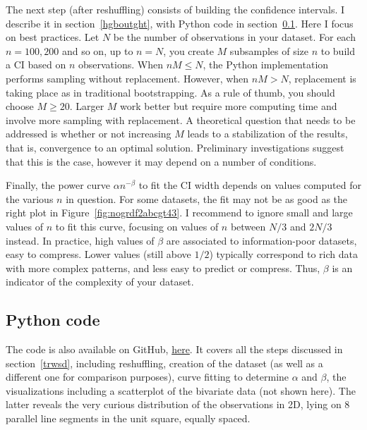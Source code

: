 \documentclass[oneside,10pt]{book}
\begin{document}
The next step (after reshuffling) consists of building the confidence intervals. I describe it in section~\ref{hgboutght}, 
 with Python code in section~\ref{joyofpython}. Here I focus on best practices. Let $N$ be the number of observations in your dataset.
 For each $n=100, 200$ and so on, up to $n = N$, you create $M$ subsamples of size $n$ to build a CI based on $n$ observations. 
When $nM \leq N$, the Python implementation performs sampling without replacement. However, when $nM > N$, replacement is taking place as in traditional \textcolor{index}{bootstrapping}. As a rule of thumb, you should choose $M\geq 20$.
 Larger $M$ work better but require more computing time and involve more sampling with replacement. A theoretical question that needs to be addressed is whether or not increasing $M$ leads to a stabilization of the results, that is, convergence to an optimal solution. 
 Preliminary investigations suggest that this is the case, however it may depend on a number of conditions.

Finally, the power curve $\alpha n^{-\beta}$ to fit the CI width depends on values computed for the various $n$ in question. For some datasets, the fit may not be as good as the right plot in Figure~\ref{fig:nogrdf2abcgt43}. I recommend to ignore small and large values of $n$ to fit this curve, focusing on values of $n$ between $N/3$ and $2N/3$ instead. In practice, high values of $\beta$ 
 are associated to information-poor datasets, easy to compress. Lower values (still above $1/2$) typically correspond to rich data
 with more complex patterns, and less easy to predict or compress. Thus, $\beta$ is an indicator of the complexity of your dataset.



\subsection{Python code}\label{joyofpython}


The code is also available on GitHub, \href{https://github.com/VincentGranville/Statistical-Optimization/blob/main/confidenceIntervals.py}{here}. It covers all the steps discussed in section~\ref{trwsd}, including reshuffling, creation of the dataset (as well as a different one for comparison purposes), 
 curve fitting to determine $\alpha$ and $\beta$, the visualizations including a scatterplot of the 
 bivariate data (not shown here). The latter reveals the very curious distribution of the observations in 2D, lying on 8 parallel line segments in the unit square, equally spaced. \vspace{1ex}
\end{document}

